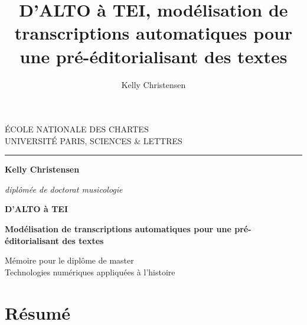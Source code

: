 \documentclass[a4paper,12pt,twoside]{book}
\author{Kelly Christensen}
\title{D’ALTO à TEI, modélisation de transcriptions automatiques pour une pré-éditorialisant des textes}
\begin{document}
	\begin{titlepage}
		\begin{center}
			
			\bigskip
			
			\begin{large}				
				ÉCOLE NATIONALE DES CHARTES\\
				UNIVERSITÉ PARIS, SCIENCES \& LETTRES
			\end{large}
			\begin{center}\rule{2cm}{0.02cm}\end{center}
			
			\bigskip
			\bigskip
			\bigskip
			\begin{Large}
				\textbf{Kelly Christensen}\\
			\end{Large}
			\begin{normalsize} 
				\textit{diplômée de doctorat musicologie}
			\end{normalsize}
			
			\bigskip
			\bigskip
			\bigskip
			
			\begin{Huge}
				\textbf{D’ALTO à TEI}\\
			\end{Huge}
			\bigskip
			\bigskip
			\begin{LARGE}
				\textbf{Modélisation de transcriptions automatiques pour une pré-éditorialisant des textes}\\
			\end{LARGE}
			
			\bigskip
			\bigskip
			\bigskip
			\begin{large}
			\end{large}
			\vfill
			
			\begin{large}
				Mémoire 
				pour le diplôme de master \\
				\og{} Technologies numériques appliquées à l'histoire \fg{} \\
			\end{large}
			
		\end{center}
	\end{titlepage}
	
	\thispagestyle{empty}	
	\cleardoublepage
	
	\frontmatter
	\cleardoublepage
	
	\chapter{Résumé}
	
\end{document}
